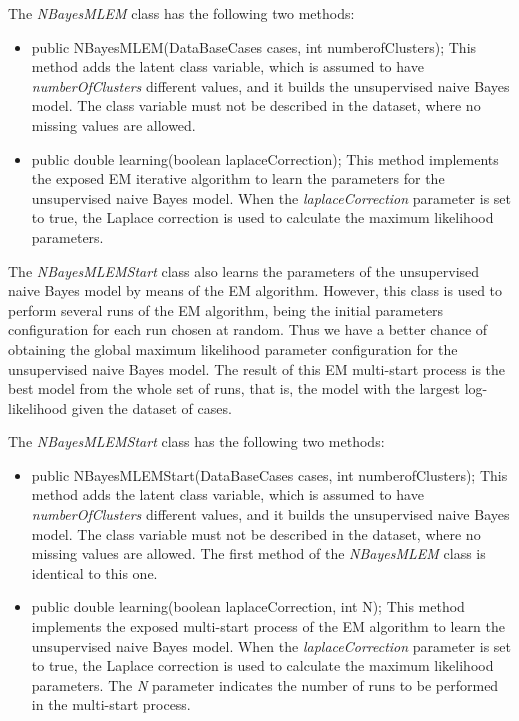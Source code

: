 The {\em NBayesMLEM} class has the following two methods:

\begin{itemize}
\item public NBayesMLEM(DataBaseCases cases, int
numberofClusters); This method adds the latent class variable,
which is assumed to have {\em numberOfClusters} different values,
and it builds the unsupervised naive Bayes model. The class
variable must not be described in the dataset, where no missing
values are allowed. \item public double learning(boolean
laplaceCorrection); This method implements the exposed EM
iterative algorithm to learn the parameters for the unsupervised
naive Bayes model. When the {\em laplaceCorrection} parameter is
set to true, the Laplace correction is used to calculate the
maximum likelihood parameters.
\end{itemize}

The {\em NBayesMLEMStart} class also learns the parameters of the
unsupervised naive Bayes model by means of the EM algorithm.
However, this class is used to perform several runs of the EM
algorithm, being the initial parameters configuration for each run
chosen at random. Thus we have a better chance of obtaining the
global maximum likelihood parameter configuration for the
unsupervised naive Bayes model. The result of this EM multi-start
process is the best model from the whole set of runs, that is, the
model with the largest log-likelihood given the dataset of cases.

The {\em NBayesMLEMStart} class has the following two methods:
\begin{itemize}
\item public NBayesMLEMStart(DataBaseCases cases, int
numberofClusters); This method adds the latent class variable,
which is assumed to have {\em numberOfClusters} different values,
and it builds the unsupervised naive Bayes model. The class
variable must not be described in the dataset, where no missing
values are allowed. The first method of the {\em NBayesMLEM} class
is identical to this one. \item public double learning(boolean
laplaceCorrection, int N); This method implements the exposed
multi-start process of the EM algorithm to learn the unsupervised
naive Bayes model. When the {\em laplaceCorrection} parameter is
set to true, the Laplace correction is used to calculate the
maximum likelihood parameters. The {\em N} parameter indicates the
number of runs to be performed in the multi-start process.
\end{itemize}
